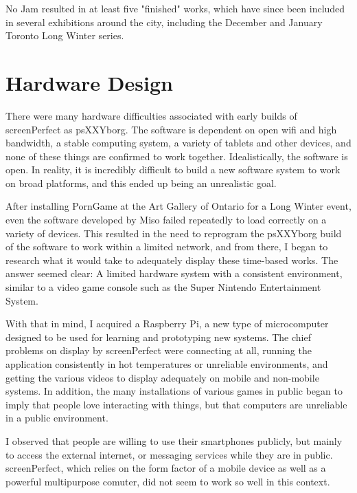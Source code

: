 No Jam resulted in at least five "finished" works, which have since been included in several exhibitions around the city, including the December and January Toronto Long Winter series.



\section{Hardware Design}

There were many hardware difficulties associated with early builds of screenPerfect as psXXYborg. The software is dependent on open wifi and high bandwidth, a stable computing system, a variety of tablets and other devices, and none of these things are confirmed to work together. Idealistically, the software is open. In reality, it is incredibly difficult to build a new software system to work on broad platforms, and this ended up being an unrealistic goal.

After installing PornGame at the Art Gallery of Ontario for a Long Winter event, even the software developed by Miso failed repeatedly to load correctly on a variety of devices. This resulted in the need to reprogram the psXXYborg build of the software to work within a limited network, and from there, I began to research what it would take to adequately display these time-based works. The answer seemed clear: A limited hardware system with a consistent environment, similar to a video game console such as the Super Nintendo Entertainment System.

With that in mind, I acquired a Raspberry Pi, a new type of microcomputer designed to be used for learning and prototyping new systems. The chief problems on display by screenPerfect were connecting at all, running the application consistently in hot temperatures or unreliable environments, and getting the various videos to display adequately on mobile and non-mobile systems. In addition, the many installations of various games in public began to imply that people love interacting with things, but that computers are unreliable in a public environment.

I observed that people are willing to use their smartphones publicly, but mainly to access the external internet, or messaging services while they are in public. screenPerfect, which relies on the form factor of a mobile device as well as a powerful multipurpose comuter, did not seem to work so well in this context.

